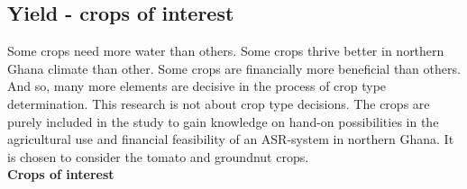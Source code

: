 %

\subsection{Yield - crops of interest}
Some crops need more water than others. Some crops thrive better in northern Ghana climate than other. Some crops are financially more beneficial than others. And so, many more elements are decisive in the process of crop type determination. This research is not about crop type decisions. The crops are purely included in the study to gain knowledge on hand-on possibilities in the agricultural use and financial feasibility of an ASR-system in northern Ghana. It is chosen to consider the tomato and groundnut crops.\\

\textbf{Crops of interest}

